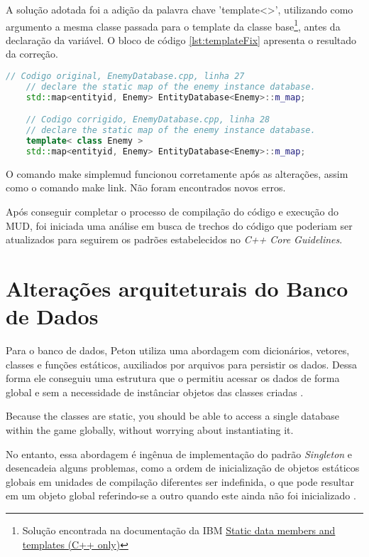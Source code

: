 A solução adotada foi a adição da palavra chave 'template<>', utilizando como argumento a mesma 
classe passada para o template da classe base\footnote{Solução encontrada na documentação da IBM 
\href{https://www.ibm.com/docs/en/zos/2.4.0?topic=only-static-data-members-templates-c}
{Static data members and templates (C++ only)}}, antes da declaração da variável. 
O bloco de código \ref{lst:templateFix} apresenta o resultado da correção.

\begin{lstlisting}[breaklines, label={lst:templateFix}, caption={Correção da declaração das variáveis estáticas}, language=C++]
    // Codigo original, EnemyDatabase.cpp, linha 27
    // declare the static map of the enemy instance database.
    std::map<entityid, Enemy> EntityDatabase<Enemy>::m_map;

    // Codigo corrigido, EnemyDatabase.cpp, linha 28
    // declare the static map of the enemy instance database.
    template< class Enemy >
    std::map<entityid, Enemy> EntityDatabase<Enemy>::m_map;
\end{lstlisting}

O comando make simplemud funcionou corretamente após as alterações, assim como o comando make link.
Não foram encontrados novos erros.

Após conseguir completar o processo de compilação do código e execução do MUD, 
foi iniciada uma análise em busca de trechos do código que poderiam ser atualizados
para seguirem os padrões estabelecidos no \textit{C++ Core Guidelines}.


\section{Alterações arquiteturais do Banco de Dados}

Para o banco de dados, Peton utiliza uma abordagem com dicionários, vetores, classes e funções estáticos, 
auxiliados por arquivos para persistir os dados. Dessa forma ele conseguiu uma estrutura que o 
permitiu acessar os dados de forma global e sem a necessidade de instânciar objetos das classes 
criadas \cite{penton2003mud}.

\begin{citacao}
    Because the classes are static, you should be able to access
    a single database within the game globally, without
    worrying about instantiating it.\cite{penton2003mud}
\end{citacao}

No entanto, essa abordagem é ingênua de implementação do padrão \textit{Singleton} 
e desencadeia alguns problemas, como a ordem de inicialização de objetos estáticos 
globais em unidades de compilação diferentes ser indefinida, o que pode resultar
em um objeto global referindo-se a outro quando este ainda não foi inicializado \cite{nesteruk2018design}.

